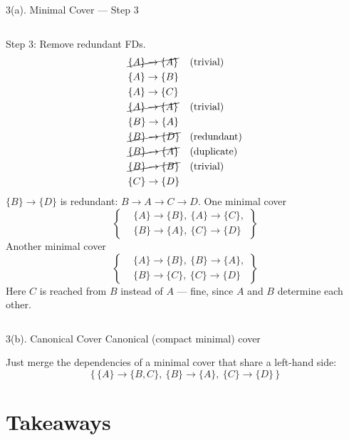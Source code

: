 \documentclass{beamer}
\newcommand\fd[2]{\{#1\} \rightarrow \{#2\}}
\begin{document}
\begin{frame}{3(a). Minimal Cover --- Step 3}
\small
\begin{columns}[t,onlytextwidth]
\alert{Step 3: Remove redundant FDs.}
\[
\begin{aligned}
&\cancel{\fd{A}{A}} && \text{(trivial)}\\
&\fd{A}{B}\\
&\fd{A}{C}\\
&\cancel{\fd{A}{A}} && \text{(trivial)}\\
&\fd{B}{A}\\
&\cancel{\fd{B}{D}} && \text{(redundant)}\\
&\cancel{\fd{B}{A}} && \text{(duplicate)}\\
&\cancel{\fd{B}{B}} && \text{(trivial)}\\
&\fd{C}{D}
\end{aligned}
\]
\footnotesize
$\fd{B}{D}$ is redundant: $B \rightarrow A \rightarrow C \rightarrow D$.
\pause
{}
\alert{One minimal cover}
\[
\left\{
\begin{aligned}
&\fd{A}{B},\ \fd{A}{C},\\
&\fd{B}{A},\ \fd{C}{D}
\end{aligned}
\right\}
\]
\pause
\alert{Another minimal cover}
\[
\left\{
\begin{aligned}
&\fd{A}{B},\ \fd{B}{A},\\
&\fd{B}{C},\ \fd{C}{D}
\end{aligned}
\right\}
\]
\footnotesize
Here $C$ is reached from $B$ instead of $A$ --- fine, since $A$ and $B$ determine each other.
\end{columns}
\end{frame}

\begin{frame}{3(b). Canonical Cover}
\vfill
\alert{Canonical (compact minimal) cover}
\medskip

Just merge the dependencies of a minimal cover that share a left-hand side:
\[
\{\, \fd{A}{B,C},\ \fd{B}{A},\ \fd{C}{D} \,\}
\]
\vfill
\end{frame}

\section{Takeaways}
\end{document}
